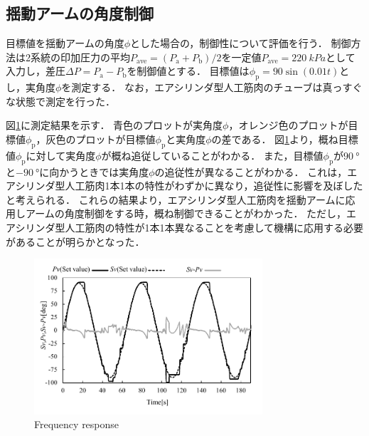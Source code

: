 \subsection{揺動アームの角度制御}
目標値を揺動アームの角度$\phi$とした場合の，制御性について評価を行う．
制御方法は2系統の印加圧力の平均$P_\mathrm{ave}=(P_\mathrm{a} + P_\mathrm{b})/2$を一定値$P_\mathrm{ave}=\SI{220}{kPa}$として入力し，差圧$\Delta P = P_\mathrm{a} - P_\mathrm{b}$を制御値とする．
目標値は$\phi_\mathrm{p} = 90 \sin(0.01t)$とし，実角度$\phi$を測定する．
なお，エアシリンダ型人工筋肉のチューブは真っすぐな状態で測定を行った．
\par
図\ref{Frequency response}に測定結果を示す．
青色のプロットが実角度$\phi$，オレンジ色のプロットが目標値$\phi_\mathrm{p}$，灰色のプロットが目標値$\phi_\mathrm{p}$と実角度$\phi$の差である．
図\ref{Frequency response}より，概ね目標値$\phi_\mathrm{p}$に対して実角度$\phi$が概ね追従していることがわかる．
また，目標値$\phi_\mathrm{p}$が$\SI{90}{\degree}$と$\SI{-90}{\degree}$に向かうときでは実角度$\phi$の追従性が異なることがわかる．
これは，エアシリンダ型人工筋肉1本1本の特性がわずかに異なり，追従性に影響を及ぼしたと考えられる．
これらの結果より，エアシリンダ型人工筋肉を揺動アームに応用しアームの角度制御をする時，概ね制御できることがわかった．
ただし，エアシリンダ型人工筋肉の特性が1本1本異なることを考慮して機構に応用する必要があることが明らかとなった．
\begin{figure}[t]
  \centering
  \includegraphics[width=85mm]{_pdf/result_frequency_response.pdf}
  \caption{Frequency response}
  \label{Frequency response}
\end{figure}

